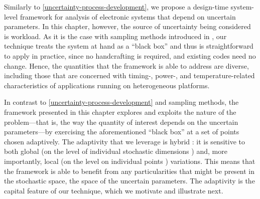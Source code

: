 Similarly to \cref{uncertainty-process-development}, we propose a design-time
system-level framework for analysis of electronic systems that depend on
uncertain parameters. In this chapter, however, the source of uncertainty being
considered is workload. As it is the case with sampling methods introduced in
, our technique treats the system at hand as a ``black box'' and thus
is straightforward to apply in practice, since no handcrafting is required, and
existing codes need no change. Hence, the quantities that the framework is able
to address are diverse, including those that are concerned with timing-, power-,
and temperature-related characteristics of applications running on heterogeneous
platforms.

In contrast to \cref{uncertainty-process-development} and sampling methods, the
framework presented in this chapter explores and exploits the nature of the
problem---that is, the way the quantity of interest depends on the uncertain
parameters---by exercising the aforementioned ``black box'' at a set of points
chosen adaptively. The adaptivity that we leverage is hybrid \cite{jakeman2012}:
it is sensitive to both global (on the level of individual stochastic dimensions
\cite{klimke2006}) and, more importantly, local (on the level on individual
points \cite{ma2009}) variations. This means that the framework is able to
benefit from any particularities that might be present in the stochastic space,
the space of the uncertain parameters. The adaptivity is the capital feature of
our technique, which we motivate and illustrate next.
